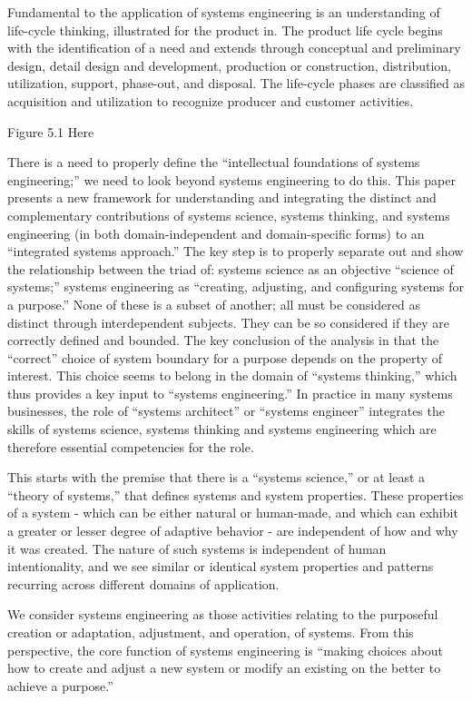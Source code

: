 Fundamental to the application of systems engineering is an understanding of life-cycle thinking, illustrated for the product in. The product life cycle begins with the identification of a need and extends through conceptual and preliminary design, detail design and development, production or construction, distribution, utilization, support, phase-out, and disposal. The life-cycle phases are classified as acquisition and utilization to recognize producer and customer activities.

Figure 5.1 Here

There is a need to properly define the ``intellectual foundations of systems engineering;'' we need to look beyond systems engineering to do this. This paper presents a new framework for understanding and integrating the distinct and complementary contributions of systems science, systems thinking, and systems engineering (in both domain-independent and domain-specific forms) to an ``integrated systems approach.'' The key step is to properly separate out and show the relationship between the triad of: systems science as an objective ``science of systems;'' systems engineering as ``creating, adjusting, and configuring systems for a purpose.'' None of these is a subset of another; all must be considered as distinct through interdependent subjects. They can be so considered if they are correctly defined and bounded. The key conclusion of the analysis in that the ``correct'' choice of system boundary for a purpose depends on the property of interest. This choice seems to belong in the domain of ``systems thinking,'' which thus provides a key input to ``systems engineering.'' In practice in many systems businesses, the role of “systems architect” or ``systems engineer'' integrates the skills of systems science, systems thinking and systems engineering which are therefore essential competencies for the role.

This starts with the premise that there is a ``systems science,'' or at least a ``theory of systems,'' that defines systems and system properties. These properties of a system - which can be either natural or human-made, and which can exhibit a greater or lesser degree of adaptive behavior - are independent of how and why it was created. The nature of such systems is independent of human intentionality, and we see similar or identical system properties and patterns recurring across different domains of application.

We consider systems engineering as those activities relating to the purposeful creation or adaptation, adjustment, and operation, of systems. From this perspective, the core function of systems engineering is ``making choices about how to create and adjust a new system or modify an existing on the better to achieve a purpose.''

